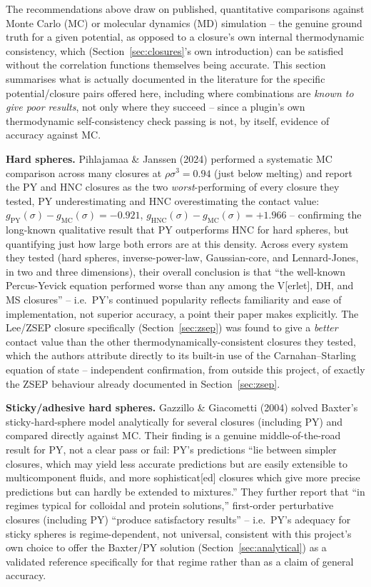 \documentclass[11pt,a4paper]{article}
\begin{document}
The recommendations above draw on published, quantitative comparisons
against Monte Carlo (MC) or molecular dynamics (MD) simulation -- the
genuine ground truth for a given potential, as opposed to a closure's own
internal thermodynamic consistency, which (Section~\ref{sec:closures}'s own
introduction) can be satisfied without the correlation functions themselves
being accurate. This section summarises what is actually documented in the
literature for the specific potential/closure pairs offered here, including
where combinations are \emph{known to give poor results}, not only where
they succeed -- since a plugin's own thermodynamic self-consistency check
passing is not, by itself, evidence of accuracy against MC.

\textbf{Hard spheres.} Pihlajamaa \& Janssen (2024) \cite{PihlajamaaJanssen2024}
performed a systematic MC comparison across many closures at
$\rho\sigma^3=0.94$ (just below melting) and report the PY and HNC closures
as the two \emph{worst}-performing of every closure they tested, PY
underestimating and HNC overestimating the contact value:
$g_{\mathrm{PY}}(\sigma)-g_{\mathrm{MC}}(\sigma)=-0.921$,
$g_{\mathrm{HNC}}(\sigma)-g_{\mathrm{MC}}(\sigma)=+1.966$ -- confirming the
long-known qualitative result that PY outperforms HNC for hard spheres, but
quantifying just how large both errors are at this density. Across every
system they tested (hard spheres, inverse-power-law, Gaussian-core, and
Lennard-Jones, in two and three dimensions), their overall conclusion is
that ``the well-known Percus-Yevick equation performed worse than any among
the V[erlet], DH, and MS closures'' -- i.e.\ PY's continued popularity
reflects familiarity and ease of implementation, not superior accuracy, a
point their paper makes explicitly. The Lee/ZSEP closure specifically
(Section~\ref{sec:zsep}) was found to give a \emph{better} contact value
than the other thermodynamically-consistent closures they tested, which the
authors attribute directly to its built-in use of the Carnahan--Starling
equation of state -- independent confirmation, from outside this project,
of exactly the ZSEP behaviour already documented in Section~\ref{sec:zsep}.

\textbf{Sticky/adhesive hard spheres.} Gazzillo \& Giacometti (2004)
\cite{gazzillo2004} solved Baxter's sticky-hard-sphere model analytically
for several closures (including PY) and compared directly against MC. Their
finding is a genuine middle-of-the-road result for PY, not a clear pass or
fail: PY's predictions ``lie between simpler closures, which may yield less
accurate predictions but are easily extensible to multicomponent fluids,
and more sophisticat[ed] closures which give more precise predictions but
can hardly be extended to mixtures.'' They further report that ``in regimes
typical for colloidal and protein solutions,'' first-order perturbative
closures (including PY) ``produce satisfactory results'' -- i.e.\ PY's
adequacy for sticky spheres is regime-dependent, not universal, consistent
with this project's own choice to offer the Baxter/PY solution
(Section~\ref{sec:analytical}) as a validated reference specifically for
that regime rather than as a claim of general accuracy.
\end{document}
